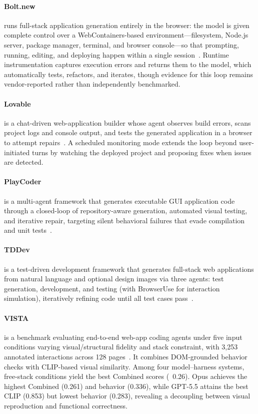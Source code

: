 \paragraph{Bolt.new} runs full-stack application generation entirely in the browser: the model is given complete control over a WebContainers-based environment---filesystem, Node.js server, package manager, terminal, and browser console---so that prompting, running, editing, and deploying happen within a single session~\cite{stackblitz2024boltnew}. Runtime instrumentation captures execution errors and returns them to the model, which automatically tests, refactors, and iterates, though evidence for this loop remains vendor-reported rather than independently benchmarked.

\paragraph{Lovable} is a chat-driven web-application builder whose agent observes build errors, scans project logs and console output, and tests the generated application in a browser to attempt repairs~\cite{lovable2024docs}. A scheduled monitoring mode extends the loop beyond user-initiated turns by watching the deployed project and proposing fixes when issues are detected.


\paragraph{PlayCoder}
 is a multi-agent framework that generates executable GUI application code through a closed-loop of repository-aware generation, automated visual testing, and iterative repair, targeting silent behavioral failures that evade compilation and unit tests~\cite{avg260419742}. 

\paragraph{TDDev}
 is a test-driven development framework that generates full-stack web applications from natural language and optional design images via three agents: test generation, development, and testing (with BrowserUse for interaction simulation), iteratively refining code until all test cases pass~\cite{avg250925297}.

\paragraph{VISTA}
 is a benchmark evaluating end-to-end web-app coding agents under five input conditions varying visual/structural fidelity and stack constraint, with 3,253 annotated interactions across 128 pages~\cite{avg260526144}. It combines DOM-grounded behavior checks with CLIP-based visual similarity. Among four model–harness systems, free-stack conditions yield the best Combined scores (~0.26). Opus achieves the highest Combined (0.261) and behavior (0.336), while GPT-5.5 attains the best CLIP (0.853) but lowest behavior (0.283), revealing a decoupling between visual reproduction and functional correctness.


